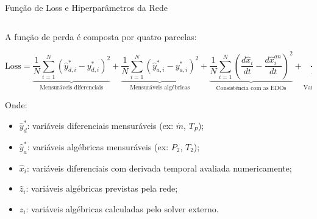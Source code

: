\begin{frame}{Função de Loss e Hiperparâmetros da Rede}
    \begin{columns}[T]
        \begin{column}{0.55\textwidth}
            \footnotesize
            A função de perda é composta por quatro parcelas:

            \vspace{0.2cm}
            \scriptsize
            \[
            \text{Loss} = 
            \underbrace{
            \frac{1}{N} \sum_{i=1}^{N} \left( \hat{y}_{d,i}^* - y_{d,i}^* \right)^2
            }_{\text{Mensuráveis diferenciais}} 
            + 
            \underbrace{
            \frac{1}{N} \sum_{i=1}^{N} \left( \hat{y}_{a,i}^* - y_{a,i}^* \right)^2
            }_{\text{Mensuráveis algébricas}} 
            + 
            \underbrace{
            \frac{1}{N} \sum_{i=1}^{N} \left( \frac{d\hat{x}_i}{dt} - \frac{d\hat{x}_i^{an}}{dt} \right)^2
            }_{\text{Consistência com as EDOs}} 
            + 
            \underbrace{
            \frac{1}{N} \sum_{i=1}^{N} \left( \hat{z}_i - z_i \right)^2
            }_{\text{Variáveis algébricas estimadas}}
            \]

            \vspace{0.3cm}
            Onde:
            \begin{itemize}
                \item \( \hat{y}_{d}^* \): variáveis diferenciais mensuráveis (ex: \( \dot{m} \), \( T_P \));
                \item \( \hat{y}_{a}^* \): variáveis algébricas mensuráveis (ex: \( P_2 \), \( T_2 \));
                \item \( \hat{x}_i \): variáveis diferenciais com derivada temporal avaliada numericamente;
                \item \( \hat{z}_i \): variáveis algébricas previstas pela rede;
                \item \( z_i \): variáveis algébricas calculadas pelo solver externo.
            \end{itemize}
        \end{column}


\end{columns}
\end{frame}
